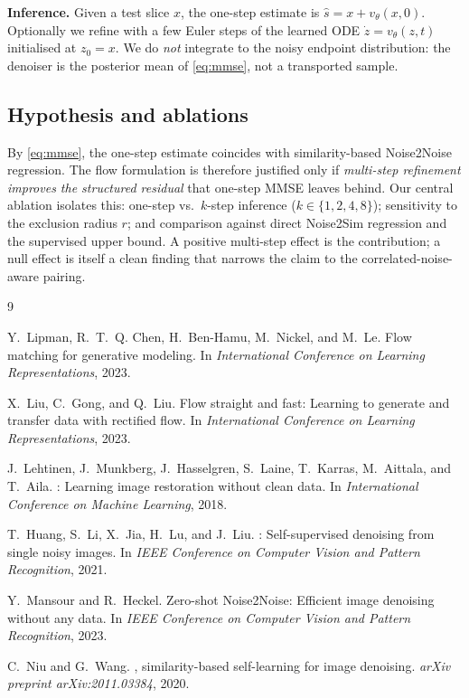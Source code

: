 \documentclass[10pt,twocolumn]{article}
\begin{document}
\noindent\textbf{Inference.} Given a test slice $x$, the one-step estimate
is $\hat s = x + v_\theta(x,0)$. Optionally we refine with a few Euler steps
of the learned ODE $\dot z = v_\theta(z,t)$ initialised at $z_0=x$. We do
\emph{not} integrate to the noisy endpoint distribution: the denoiser is the
posterior mean of \eqref{eq:mmse}, not a transported sample.

\subsection{Hypothesis and ablations}
By \eqref{eq:mmse}, the one-step estimate coincides with similarity-based
Noise2Noise regression. The flow formulation is therefore justified only if
\emph{multi-step refinement improves the structured residual} that one-step
MMSE leaves behind. Our central ablation isolates this: one-step vs.\
$k$-step inference ($k\in\{1,2,4,8\}$); sensitivity to the exclusion radius
$r$; and comparison against direct Noise2Sim regression and the supervised
upper bound. A positive multi-step effect is the contribution; a null effect
is itself a clean finding that narrows the claim to the
correlated-noise-aware pairing.


\begin{thebibliography}{9}

Y.~Lipman, R.~T.~Q. Chen, H.~Ben-Hamu, M.~Nickel, and M.~Le.
\newblock Flow matching for generative modeling.
\newblock In \emph{International Conference on Learning Representations}, 2023.

X.~Liu, C.~Gong, and Q.~Liu.
\newblock Flow straight and fast: Learning to generate and transfer data with
  rectified flow.
\newblock In \emph{International Conference on Learning Representations}, 2023.

J.~Lehtinen, J.~Munkberg, J.~Hasselgren, S.~Laine, T.~Karras, M.~Aittala,
  and T.~Aila.
: Learning image restoration without clean data.
\newblock In \emph{International Conference on Machine Learning}, 2018.

T.~Huang, S.~Li, X.~Jia, H.~Lu, and J.~Liu.
: Self-supervised denoising from single noisy
  images.
\newblock In \emph{IEEE Conference on Computer Vision and Pattern Recognition},
  2021.

Y.~Mansour and R.~Heckel.
\newblock Zero-shot {Noise2Noise}: Efficient image denoising without any data.
\newblock In \emph{IEEE Conference on Computer Vision and Pattern Recognition},
  2023.

C.~Niu and G.~Wang.
, similarity-based self-learning for image denoising.
\newblock \emph{arXiv preprint arXiv:2011.03384}, 2020.

\end{thebibliography}
\end{document}
